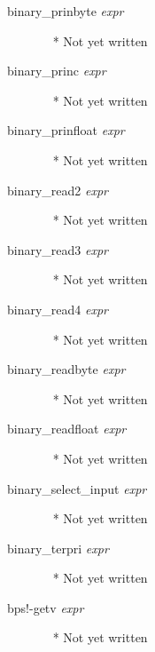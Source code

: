 \documentclass[a4paper,11pt]{article}
\begin{document}
\begin{description}
\item [{\ttfamily binary\_prinbyte} {\itshape  expr}]  ~\newline
  * Not yet written

\item [{\ttfamily binary\_princ} {\itshape  expr}]  ~\newline
  * Not yet written

\item [{\ttfamily binary\_prinfloat} {\itshape  expr}]  ~\newline
  * Not yet written

\item [{\ttfamily binary\_read2} {\itshape  expr}]  ~\newline
  * Not yet written

\item [{\ttfamily binary\_read3} {\itshape  expr}]  ~\newline
  * Not yet written

\item [{\ttfamily binary\_read4} {\itshape  expr}]  ~\newline
  * Not yet written

\item [{\ttfamily binary\_readbyte} {\itshape  expr}]  ~\newline
  * Not yet written

\item [{\ttfamily binary\_readfloat} {\itshape  expr}]  ~\newline
  * Not yet written

\item [{\ttfamily binary\_select\_input} {\itshape  expr}]  ~\newline
  * Not yet written

\item [{\ttfamily binary\_terpri} {\itshape  expr}]  ~\newline
  * Not yet written

\item [{\ttfamily bps!-getv} {\itshape  expr}]  ~\newline
  * Not yet written


\end{description}
\end{document}
